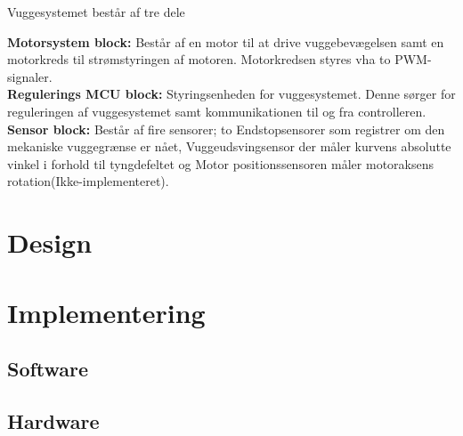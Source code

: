 
Vuggesystemet består af tre dele

\textbf{Motorsystem block:} Består af en motor til at drive vuggebevægelsen samt en motorkreds til strømstyringen af motoren. Motorkredsen styres vha to PWM-signaler.\\
\textbf{Regulerings MCU block:} Styringsenheden for vuggesystemet. Denne sørger for reguleringen af vuggesystemet samt kommunikationen til og fra controlleren.\\
\textbf{Sensor block:} Består af fire sensorer; to Endstopsensorer som registrer om den mekaniske vuggegrænse er nået, Vuggeudsvingsensor der måler kurvens absolutte vinkel i forhold til tyngdefeltet og Motor positionssensoren måler motoraksens rotation(Ikke-implementeret).



\section{Design}
\label{vs_design}




\section{Implementering}
\label{vs_implementering}



\subsection*{Software}
\label{vs_implementering_sw}


\subsection*{Hardware}
\label{vs_implementering_hw}

